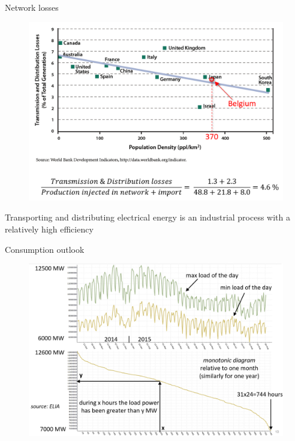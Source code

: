 \begin{frame}
{Network losses}
\begin{figure}
\centering
\includegraphics[width=0.9\linewidth]{images/network_losses_world.png}
\end{figure}
Transporting and distributing electrical energy is an industrial process with a relatively high efficiency
\end{frame}

\begin{frame}
{Consumption outlook}
\begin{figure}
\centering
\includegraphics[width=\linewidth]{images/consumption_be.png}
\end{figure}
\end{frame}

